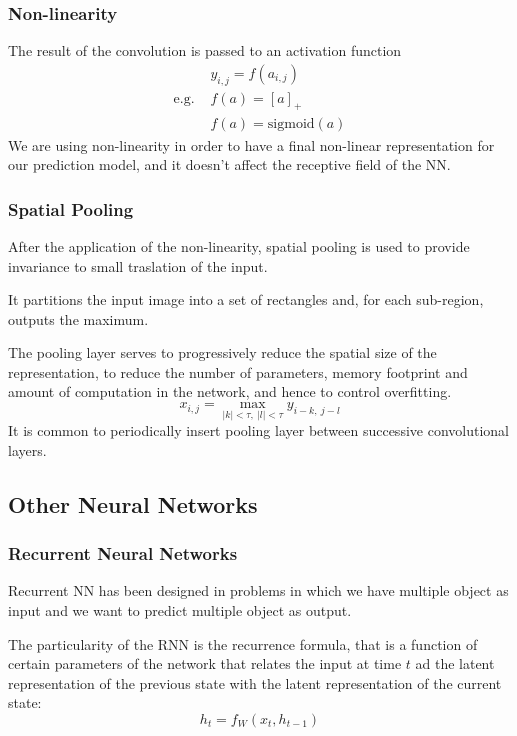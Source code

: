 \documentclass[a4paper,6pt,twocolumn,fleqn]{article}
\begin{document}
\subsubsection{Non-linearity} %
The result of the convolution is passed to an activation function
\begin{align}
    &y_{i,j} = f (a_{i,j})\\
    \text{e.g. } & f(a) = [a]_+\\
    & f(a) = \text{sigmoid}(a)
\end{align}
We are using non-linearity in order to have a final non-linear representation for our prediction model, and it doesn't affect the receptive field of the NN.
\subsubsection{Spatial Pooling} %
After the application of the non-linearity, spatial pooling is used to provide invariance to small traslation of the input.

It partitions the input image into a set of rectangles and, for each sub-region, outputs the maximum.

The pooling layer serves to progressively reduce the spatial size of the representation, to reduce the number of parameters, memory footprint and amount of computation in the network, and hence to control overfitting.
\begin{equation}
    x_{i,j} = \max_{|k| < \tau,\ |l| < \tau} y_{i-k,\ j-l}
\end{equation}
It is common to periodically insert pooling layer between successive convolutional layers.
\subsection{Other Neural Networks} %
\subsubsection{Recurrent Neural Networks} %
Recurrent NN has been designed in problems in which we have multiple object as input and we want to predict multiple object as output. 

The particularity of the RNN is the recurrence formula, that is a function of certain parameters of the network that relates the input at time \(t\) ad the latent representation of the previous state with the latent representation of the current state:
\begin{equation}
    h_t = f_W(x_t, h_{t-1})
\end{equation}
\end{document}
